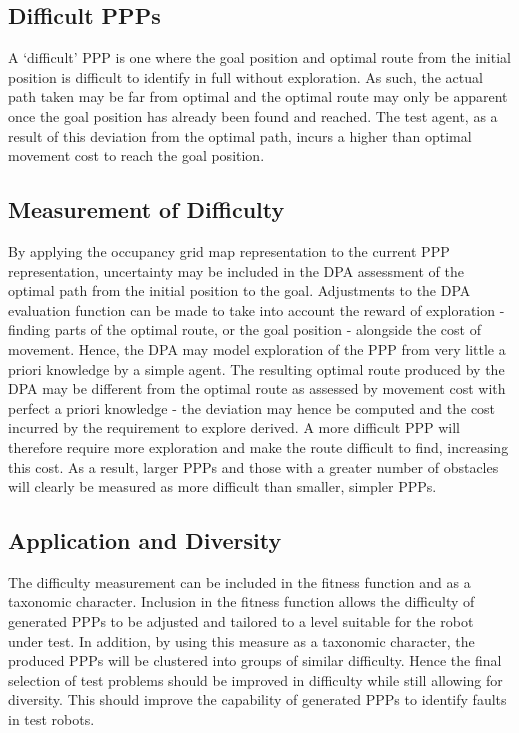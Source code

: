 \documentclass[authoryearcitations]{UoYCSproject}
\begin{document}
\subsection{Difficult PPPs}
\label{sec:pa3_difficult}
A ‘difficult’ PPP is one where the goal position and optimal route from the initial position is difficult to identify in full without exploration. As such, the actual path taken may be far from optimal and the optimal route may only be apparent once the goal position has already been found and reached. The test agent, as a result of this deviation from the optimal path, incurs a higher than optimal movement cost to reach the goal position.

\subsection{Measurement of Difficulty}
\label{sec:pa3_measurement}
By applying the occupancy grid map representation to the current PPP representation, uncertainty may be included in the DPA assessment of the optimal path from the initial position to the goal. Adjustments to the DPA evaluation function can be made to take into account the reward of exploration - finding parts of the optimal route, or the goal position - alongside the cost of movement. Hence, the DPA may model exploration of the PPP from very little a priori knowledge by a simple agent. The resulting optimal route produced by the DPA may be different from the optimal route as assessed by movement cost with perfect a priori knowledge - the deviation may hence be computed and the cost incurred by the requirement to explore derived. A more difficult PPP will therefore require more exploration and make the route difficult to find, increasing this cost. As a result, larger PPPs and those with a greater number of obstacles will clearly be measured as more difficult than smaller, simpler PPPs.

\subsection{Application and Diversity}
\label{sec:pa3_app_div}
The difficulty measurement can be included in the fitness function and as a taxonomic character. Inclusion in the fitness function allows the difficulty of generated PPPs to be adjusted and tailored to a level suitable for the robot under test. In addition, by using this measure as a taxonomic character, the produced PPPs will be clustered into groups of similar difficulty. Hence the final selection of test problems should be improved in difficulty while still allowing for diversity. This should improve the capability of generated PPPs to identify faults in test robots.
\end{document}
